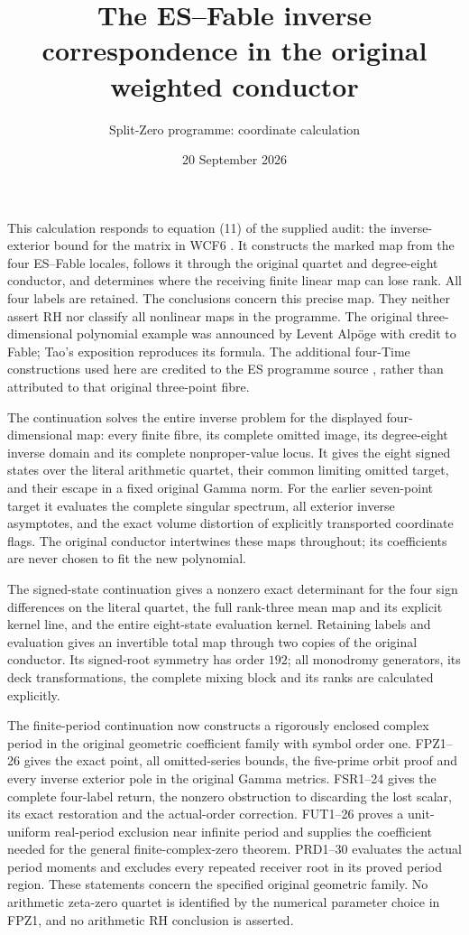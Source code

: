 \documentclass[11pt]{article}
\title{The ES--Fable inverse correspondence in the original weighted conductor}
\author{Split-Zero programme: coordinate calculation}
\date{20 September 2026}
\begin{document}
\maketitle

This calculation responds to equation (11) of the supplied audit: the
inverse-exterior bound for the matrix in WCF6 \cite{WCF}. It constructs
the marked map from the four ES--Fable locales, follows it through the
original quartet and degree-eight conductor, and determines where the
receiving finite linear map can lose rank. All four labels are retained.
The conclusions concern this precise map. They neither assert RH nor
classify all nonlinear maps in the programme.
The original three-dimensional polynomial example was announced by
Levent Alp\"oge with credit to Fable; Tao's exposition \cite{Tao}
reproduces its formula. The additional four-Time constructions used here
are credited to the ES programme source \cite{ES}, rather than attributed
to that original three-point fibre.

The continuation solves the entire inverse problem for the displayed
four-dimensional map: every finite fibre, its complete omitted image,
its degree-eight inverse domain and its complete nonproper-value locus.
It gives the eight signed states over the literal arithmetic quartet,
their common limiting omitted target, and their escape in a fixed
original Gamma norm. For the earlier seven-point target it evaluates
the complete singular spectrum, all exterior inverse asymptotes, and
the exact volume distortion of explicitly transported coordinate flags.
The original conductor intertwines these maps throughout; its coefficients
are never chosen to fit the new polynomial.

The signed-state continuation gives a nonzero exact determinant for the
four sign differences on the literal quartet, the full rank-three mean
map and its explicit kernel line, and the entire eight-state evaluation
kernel. Retaining labels and evaluation gives an invertible total map
through two copies of the original conductor. Its signed-root symmetry
has order $192$; all monodromy generators, its deck transformations,
the complete mixing block and its ranks are calculated explicitly.


The finite-period continuation now constructs a rigorously enclosed complex
period in the original geometric coefficient family with symbol order one.
FPZ1--26 gives the exact point, all omitted-series bounds, the five-prime
orbit proof and every inverse exterior pole in the original Gamma metrics.
FSR1--24 gives the complete four-label return, the nonzero obstruction to
discarding the lost scalar, its exact restoration and the actual-order
correction. FUT1--26 proves a unit-uniform real-period exclusion near
infinite period and supplies the coefficient needed for the general
finite-complex-zero theorem. PRD1--30 evaluates the actual period moments
and excludes every repeated receiver root in its proved period region.
These statements concern the specified original geometric family.
No arithmetic zeta-zero quartet is identified by the numerical parameter
choice in FPZ1, and no arithmetic RH conclusion is asserted.
\end{document}
